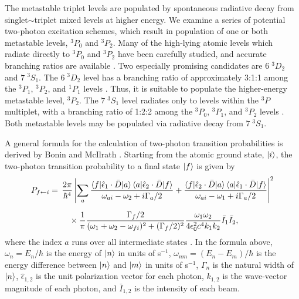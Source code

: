 \documentclass[12pt]{mitthesis}
\begin{document}
The metastable triplet levels are populated by spontaneous radiative
decay from singlet$\sim$triplet mixed levels at higher energy.  We
examine a series of potential two-photon excitation schemes, which
result in population of one or both metastable levels, $^3P_0$ and
$^3P_2$.  Many of the high-lying atomic levels which radiate directly
to $^3P_0$ and $^3P_2$ have been carefully studied, and accurate
branching ratios are available \cite{benck89}.  Two especially
promising candidates are $6 \; ^3D_2$ and $7 \; ^3S_1$.  The $6 \;
^3D_2$ level has a branching ratio of approximately 3:1:1 among the
$^3P_1$, $^3P_2$, and $^1P_1$ levels \cite{benck89}.  Thus, it is
suitable to populate the higher-energy metastable level, $^3P_2$.  The
$7 \; ^3S_1$ level radiates only to levels within the $^3P$ multiplet,
with a branching ratio of 1:2:2 among the $^3P_0$, $^3P_1$, and
$^3P_2$ levels \cite{benck89}.  Both metastable levels may be
populated via radiative decay from $7 \; ^3S_1$.

A general formula for the calculation of two-photon transition
probabilities is derived by Bonin and McIlrath \cite{bonin84}.
Starting from the atomic ground state, $\mathinner{|{i}\rangle}$, the two-photon
transition probability to a final state $\mathinner{|{f}\rangle}$ is given by
\begin{equation}
  \label{eq:tpa-prob}
  \begin{split}
    P_{f \leftarrow i} = &\: \: \frac{2 \pi}{\hbar^4}
    \left \lvert
      \sum_a
      \frac{
        \mathinner{\langle{f|\hat{\epsilon}_1 \cdot \bar{D}|a}\rangle}\mathinner{\langle{a|\hat{\epsilon}_2 \cdot \bar{D}|f}\rangle}
      }{
        \omega_{ai} - \omega_2 + i \Gamma_a / 2
      } + \frac{
        \mathinner{\langle{f|\hat{\epsilon}_2 \cdot \bar{D}|a}\rangle}\mathinner{\langle{a|\hat{\epsilon}_1 \cdot \bar{D}|f}\rangle}
      }{
        \omega_{ai} - \omega_1 + i \Gamma_a / 2
      }
    \right \rvert ^2\\[2mm]
    & \: \: \: \: \: \: \times 
      \frac{1}{\pi} 
      \frac{
        \Gamma_f / 2
      }{
        (\omega_1 + \omega_2 - \omega_{fi})^2+(\Gamma_f/2)^2
      } \frac{
        \omega_1 \omega_2
      }{
        4 \epsilon_0^2 c^4 k_1 k_2
      } \bar{I}_1 \bar{I}_2,\\
  \end{split}
\end{equation}
where the index $a$ runs over all intermediate states \cite{bonin84,
  grynberg77}.  In the formula above, $\omega_n = E_n / \hbar$ is the
energy of $\mathinner{|{n}\rangle}$ in units of s$^{-1}$, $\omega_{nm} = (E_n -
E_m)/\hbar$ is the energy difference between $\mathinner{|{n}\rangle}$ and $\mathinner{|{m}\rangle}$
in units of s$^{-1}$, $\Gamma_n$ is the natural width of $\mathinner{|{n}\rangle}$,
$\hat{\epsilon}_{1,2}$ is the unit polarization vector for each
photon, $k_{1,2}$ is the wave-vector magnitude of each photon, and
$\bar{I}_{1,2}$ is the intensity of each beam.
\end{document}
